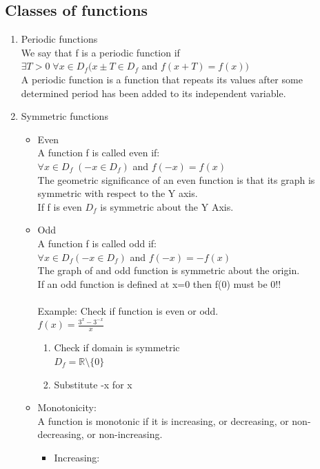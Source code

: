 \documentclass{article}
\begin{document}
\subsection{Classes of functions}
\begin{enumerate}
	\item Periodic functions \\
	We say that f is a periodic function if \\ 
	$\exists T>0 \; \forall x\in D_f(x \pm T \in D_f$ and $f(x+T) = f(x))$ \\
	A periodic function is a function that repeats its values after some determined period has been added to its independent variable.\\
	\item Symmetric functions
	\begin{itemize}
		\item Even\\
		A function f is called even if: \\
		$\forall x \in D_f \; (-x  \in D_f)$ and $f(-x) = f(x)$ \\
		The geometric  significance of an even function is that its graph is symmetric with respect to the Y axis. \\
		If f is even $D_f$ is symmetric about the Y Axis.
		\item Odd \\ 
		A function f is called odd if: \\
		$ \forall x \in D_f (-x \in D_f) $ and $f(-x) = -f(x)$\\
		The graph of and odd function is symmetric about the origin.\\
		If an odd function is defined at x=0 then f(0) must be 0!!\\ \\
		Example:
		Check if function is even or odd.\\
		$f(x) = \frac{3^x - 3^{-x}}{x}$
		\begin{enumerate}
			\item Check if domain is symmetric \\
			$D_f = \mathbb{R}\setminus \{0\}$
			\item Substitute -x for x
		\end{enumerate}
	\item Monotonicity: \\
	A function is monotonic if it is increasing, or decreasing, or non-decreasing, or non-increasing.
	\begin{itemize}
		\item Increasing:\\

\end{itemize}
\end{itemize}
\end{enumerate}
\end{document}
